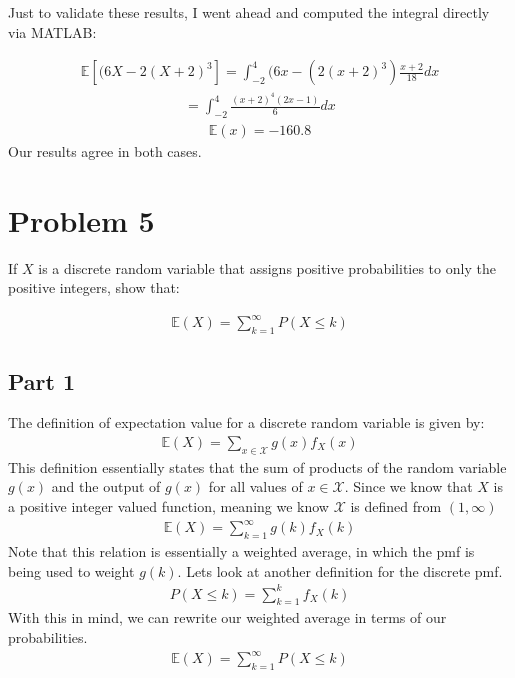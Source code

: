 \documentclass{article}
\begin{document}
Just to validate these results, I went ahead and computed the integral directly via MATLAB:

\begin{align*}
\mathbb{E}[(6X-2(X+2)^3]=\int_{-2}^{4} (6x-(2(x+2)^3) \tfrac{x+2}{18} dx
\end{align*}
\begin{align*}
=\int_{-2}^{4}  \tfrac{(x+2)^4(2x-1)}{6} dx
\end{align*}
\begin{align*}
\boxed{\mathbb{E}(x)=-160.8}
\end{align*}
Our results agree in both cases.
\clearpage

\section*{Problem 5}
If $X$ is a discrete random variable that assigns positive probabilities to only the positive integers, show that:

\begin{align*}
\mathbb{E}(X) = \sum_{k=1}^{\infty}P(X\leq k) 
\end{align*}

\subsection*{Part 1}
The definition of expectation value for a discrete random variable is given by:
\begin{align*}
\mathbb{E}(X) = \sum_{x\in \mathcal{X}} g(x)f_X(x) 
\end{align*}
This definition essentially states that the sum of products of the random variable $g(x)$ and the output of $g(x)$ for all values of $x\in \mathcal{X}$. Since we know that $X$ is a positive integer valued function, meaning we know $\mathcal{X}$ is defined from $(1,\infty)$
\begin{align*}
\mathbb{E}(X) = \sum_{k=1}^{\infty} g(k)f_X(k) 
\end{align*}
Note that this relation is essentially a weighted average, in which the pmf is being used to weight $g(k)$.
Lets look at another definition for the discrete pmf.
\begin{align*}
P(X\leq k) = \sum_{k=1}^{k} f_X(k)
\end{align*}
With this in mind, we can rewrite our weighted average in terms of our probabilities.
\begin{align*}
\boxed{\mathbb{E}(X) = \sum_{k=1}^{\infty} P(X\leq k) }
\end{align*}
\end{document}
